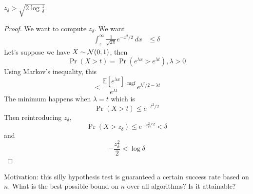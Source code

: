 \begin{lemma}
    $\displaystyle z_\delta > \sqrt{2\log{\frac{1}{\delta}}}$
\end{lemma}
\begin{proof}
    We want to compute $z_\delta$. We want
    \begin{align*}
        \int_z^\infty \frac{1}{\sqrt{2\pi}} e^{-x^2/2}\ dx & \leq \delta
    \end{align*}
    Let's suppose we have $X \sim \mathcal N(0, 1)$, then
    \[\Pr(X > t) = \Pr(e^{\lambda x} > e^{\lambda t}), \lambda > 0\]
    Using Markov's inequality, this
    \[< \frac{\mathbb{E}[e^{\lambda x}]}{e^{\lambda t}} \overset{\text{mgf}}{=} e^{\lambda^2/2 - \lambda t}\]
    The minimum happens when $\lambda = t$ which is
    \[\Pr(X > t) \leq e^{-t^2 / 2}\]
    Then reintroducing $z_\delta$,
    \[\Pr(X > z_\delta)\leq e^{-z_\delta^2 / 2} < \delta\]
    and
    \[-\frac{z_\delta^2}{2} < \log \delta\]
\end{proof}

Motivation: this silly hypothesis test is guaranteed a certain success rate based on $n$. What is the best possible bound on $n$ over all algorithms? Is it attainable?